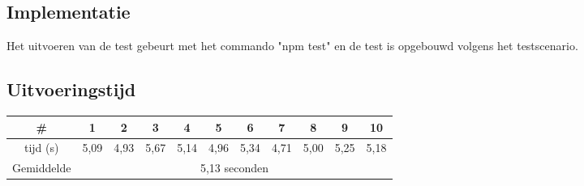 \subsection{Implementatie}
Het uitvoeren van de test gebeurt met het commando "npm test" en de test is opgebouwd volgens het testscenario.

\subsection{Uitvoeringstijd}

\begin{center}
\begin{tabular}{ |c| |c |c |c |c |c |c |c |c |c |c| }
\hline
	\# & 1 & 2 & 3 & 4 & 5 & 6 & 7 & 8 & 9 & 10\\
\hline
	tijd (s) & 5,09 & 4,93 & 5,67 & 5,14 & 4,96 & 5,34 & 4,71 & 5,00 & 5,25 & 5,18\\
\hline
 Gemiddelde & \multicolumn{10}{c|}{5,13 seconden}\\
\hline
\end{tabular}
\end{center}


